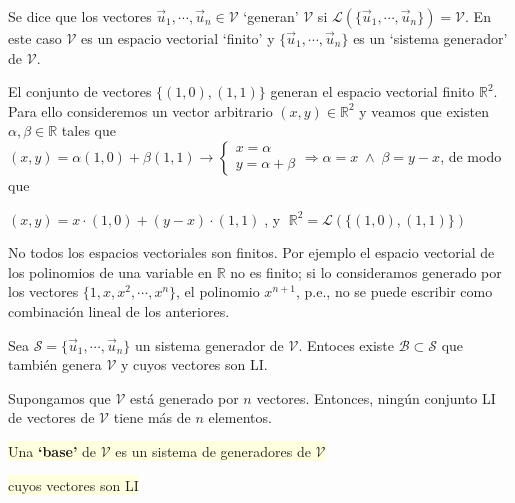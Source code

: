 \begin{defi}
Se dice que los vectores $\vec u_1, \cdots, \vec u_n \in \mathcal V$ `generan' $\mathcal V$ si $\mathcal L (\{ \vec u_1, \cdots, \vec u_n \}) = \mathcal V$. En este caso $\mathcal V$ es un espacio vectorial `finito' y  $\{ \vec u_1, \cdots, \vec u_n \}$ es un `sistema generador' de $\mathcal V$.
\end{defi}


\begin{ejem}
El conjunto de vectores 	$\{(1,0), (1,1)\}$ generan el espacio vectorial finito $\mathbb R^2$. Para ello consideremos un vector arbitrario $(x,y) \in \mathbb R^2$ y veamos que existen $\alpha, \beta \in \mathbb R$ tales que $(x,y)=\alpha (1,0)+\beta(1,1)  \longrightarrow \begin{cases} x=\alpha \\ y= \alpha+\beta \end{cases} \Rightarrow \alpha=x \; \wedge \; \beta=y-x$, de modo que 

$(x,y)=x\cdot (1,0)+ (y-x)\cdot (1,1)\; $, y $\; \mathbb R^2 = \mathcal L(\{(1,0), (1,1)\})$
\end{ejem}

\textcolor{gris}{No todos los espacios vectoriales son finitos. Por ejemplo el espacio vectorial de los polinomios de una variable en $\mathbb R$ no es finito; si lo consideramos generado por los vectores $\{1,x,x^2,\cdots ,x^n\}$, el polinomio $x^{n+1}$, p.e., no se puede escribir como combinación lineal de los anteriores.}

\begin{prop}
Sea $\mathcal S=\{\vec u_1, \cdots, \vec u_n \}$ un sistema generador de $\mathcal V$. Entoces existe $\mathcal B \subset \mathcal S$	 que también genera $\mathcal V$ y cuyos vectores son LI.
\end{prop}

\begin{prop}
Supongamos que $\mathcal V$ está generado por $n$ vectores. Entonces, ningún conjunto LI de vectores de $\mathcal V$ tiene más de $n$ elementos.	
\end{prop}

\begin{defi} \colorbox{LightYellow}{ Una \textbf{`base'} de $\mathcal V$ es un sistema de generadores de $\mathcal V$}

\noindent \colorbox{LightYellow}{cuyos vectores son LI   }	
\end{defi}
 
